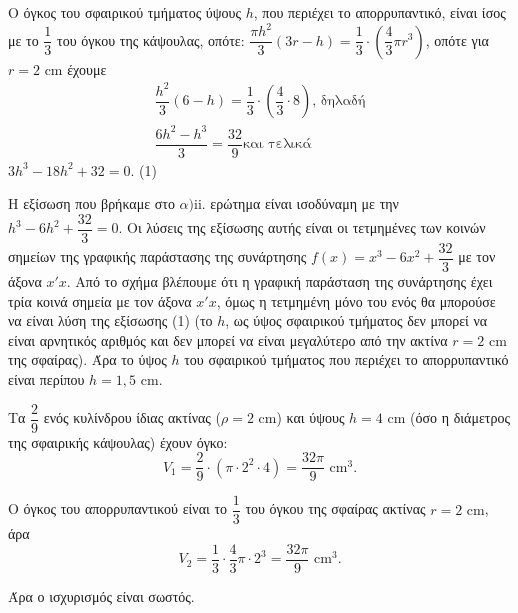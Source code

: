 
\begin{alist}
\item
\begin{rlist}
\item O όγκος του σφαιρικού τμήματος ύψους $h$, που περιέχει το απορρυπαντικό, είναι ίσος
με το $\dfrac{1}{3}$ του όγκου της κάψουλας, οπότε:
$\dfrac{\pi h^2}{3} (3r - h) = \dfrac{1}{3} \cdot \left( \dfrac{4}{3} \pi r^3 \right)$, οπότε για $r = 2\text{ cm}$ έχουμε
\begin{gather*}
\dfrac{h^2}{3} (6 - h) = \dfrac{1}{3} \cdot \left( \dfrac{4}{3} \cdot 8 \right)\text{, δηλαδή} \\
\dfrac{6h^2 - h^3}{3} = \dfrac{32}{9}\text{και τελικά}
\end{gather*}
$3h^3 - 18h^2 + 32 = 0$. (1)

\item Η εξίσωση που βρήκαμε στο $\alpha)$ii. ερώτημα είναι ισοδύναμη με την $h^3 - 6h^2 + \dfrac{32}{3} = 0$.
Οι λύσεις της εξίσωσης αυτής είναι οι τετμημένες των κοινών σημείων της γραφικής παράστασης της συνάρτησης $f(x) = x^3 - 6x^2 + \dfrac{32}{3}$ με τον άξονα $x'x$. Από το σχήμα βλέπουμε ότι η γραφική παράσταση της συνάρτησης έχει τρία κοινά σημεία με τον
άξονα $x'x$, όμως η τετμημένη μόνο του ενός θα μπορούσε να είναι λύση της εξίσωσης (1) (το $h$, ως ύψος σφαιρικού τμήματος δεν μπορεί να είναι αρνητικός αριθμός και δεν μπορεί να είναι μεγαλύτερο από την ακτίνα $r = 2\text{ cm}$ της σφαίρας). Άρα το ύψος $h$ του
σφαιρικού τμήματος που περιέχει το απορρυπαντικό είναι περίπου $h = 1,5\text{ cm}$.
\end{rlist}

\item Τα $\dfrac{2}{9}$ ενός κυλίνδρου ίδιας ακτίνας ($\rho = 2\text{ cm}$) και ύψους $h = 4\text{ cm}$ (όσο η διάμετρος
της σφαιρικής κάψουλας) έχουν όγκο:
\[V_{1} = \dfrac{2}{9} \cdot (\pi \cdot 2^2 \cdot 4) = \dfrac{32\pi}{9}\text{ cm}^3.\]

Ο όγκος του απορρυπαντικού είναι το $\dfrac{1}{3}$ του όγκου της σφαίρας ακτίνας $r = 2\text{ cm}$, άρα
\[V_{2} = \dfrac{1}{3} \cdot \dfrac{4}{3} \pi \cdot 2^3 = \dfrac{32\pi}{9}\text{ cm}^3.\]

Άρα ο ισχυρισμός είναι σωστός.
\end{alist}

